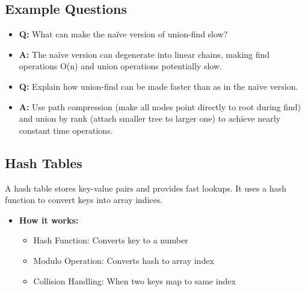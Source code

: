 \documentclass[11pt,a4paper]{article}
\begin{document}
\begin{multicols}{2}
\subsection{Example Questions}
\begin{itemize}
    \item \textbf{Q:} What can make the naïve version of union-find slow?
    \item \textbf{A:} The naïve version can degenerate into linear chains, making find operations O(n) and union operations potentially slow.

    \item \textbf{Q:} Explain how union-find can be made faster than as in the naïve version.
    \item \textbf{A:} Use path compression (make all nodes point directly to root during find) and union by rank (attach smaller tree to larger one) to achieve nearly constant time operations.
\end{itemize}

\subsection{Hash Tables}
A hash table stores key-value pairs and provides fast lookups. It uses a hash function to convert keys into array indices.

\begin{itemize}
    \item \textbf{How it works:}
    \begin{itemize}
        \item Hash Function: Converts key to a number
        \item Modulo Operation: Converts hash to array index
        \item Collision Handling: When two keys map to same index
    \end{itemize}


\end{itemize}
\end{multicols}
\end{document}
